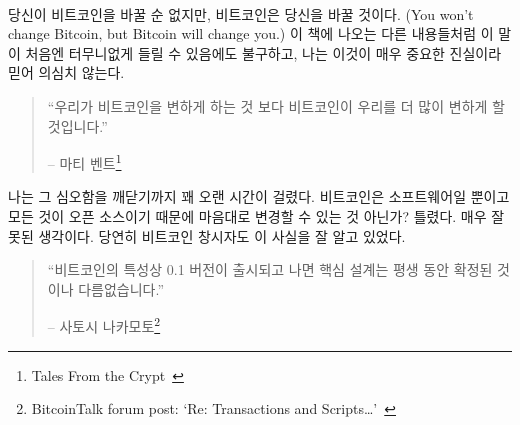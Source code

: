 \paragraph{}
당신이 비트코인을 바꿀 순 없지만, 비트코인은 당신을 바꿀 것이다.
(You won't change Bitcoin, but Bitcoin will change you.)
이 책에 나오는 다른 내용들처럼 이 말이 처음엔 터무니없게 들릴 수 있음에도 불구하고, 
나는 이것이 매우 중요한 진실이라 믿어 의심치 않는다.

\begin{quotation}\begin{samepage}
		\enquote{우리가 비트코인을 변하게 하는 것 보다 비트코인이 우리를 더 많이 변하게 할 것입니다.}
		\begin{flushright} -- 마티 벤트\footnote{Tales From the Crypt~\cite{tftc21}}
\end{flushright}\end{samepage}\end{quotation}

나는 그 심오함을 깨닫기까지 꽤 오랜 시간이 걸렸다.
비트코인은 소프트웨어일 뿐이고 모든 것이 오픈 소스이기 때문에 마음대로 변경할 수 있는 것 아닌가? 
틀렸다. 매우 잘못된 생각이다. 
당연히 비트코인 창시자도 이 사실을 잘 알고 있었다.

\begin{quotation}\begin{samepage}
		\enquote{비트코인의 특성상 0.1 버전이 출시되고 나면 핵심 설계는 평생 동안 확정된 것이나 다름없습니다.}
		\begin{flushright} -- 사토시 나카모토\footnote{BitcoinTalk forum post: `Re:
				Transactions and Scripts\ldots'~\cite{satoshi-set-in-stone}}
\end{flushright}\end{samepage}\end{quotation}

